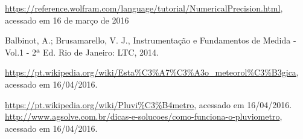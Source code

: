 \documentclass[12pt,a4paper]{instrumentacao}
\begin{document}
\begin{thebibliography}{9}
 \url{https://reference.wolfram.com/language/tutorial/NumericalPrecision.html}, acessado em 16 de março de 2016

  Balbinot, A.; Brusamarello, V. J., Instrumentação e Fundamentos de Medida - Vol.1 - 2ª Ed. Rio de Janeiro: LTC, 2014.

 \url{https://pt.wikipedia.org/wiki/Esta\%C3\%A7\%C3\%A3o_meteorol\%C3\%B3gica}, acessado em 16/04/2016.

 \url{https://pt.wikipedia.org/wiki/Pluvi\%C3\%B4metro}, acessado em 16/04/2016.
 \url{http://www.agsolve.com.br/dicas-e-solucoes/como-funciona-o-pluviometro}, acessado em 16/04/2016.




\end{thebibliography}
\end{document}
